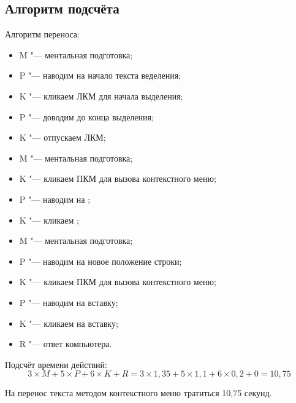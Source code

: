 \documentclass{bsuir}
\begin{document}
\subsection{Алгоритм подсчёта}
Алгоритм переноса:

\begin{itemize}
      \item M "--- ментальная подготовка;
      \item P "--- наводим на начало текста веделения;
      \item K "--- кликаем ЛКМ для начала выделения;
      \item P "--- доводим до конца выделения;
      \item K "--- отпускаем ЛКМ;
      \item M "--- ментальная подготовка;
      \item K "--- кликаем ПКМ для вызова контекстного меню;
      \item P "--- наводим на ;
      \item K "--- кликаем ;
      \item M "--- ментальная подготовка;
      \item P "--- наводим на новое положение строки;
      \item K "--- кликаем ПКМ для вызова контекстного меню;
      \item P "--- наводим на вставку;
      \item K "--- кликаем на вставку;
      \item R "--- ответ компьютера.
\end{itemize}

Подсчёт времени действий: \[
      3\times M + 5\times P + 6\times K + R =
      3\times 1,35 + 5\times 1,1 + 6\times 0,2 + 0 = 10,75
\]

На перенос текста методом контекстного меню тратиться 10,75 секунд.
\end{document}
